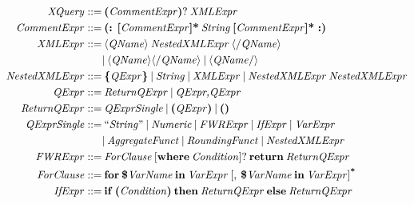 \begin{figure}[ht]
  \centering \fontsize{9}{12}\selectfont
  \begin{align*}
    \mtext{XQuery} ::= & \mspaceb \text{\textbf{(}\memph{CommentExpr}\textbf{)}}? \mspaceb \mtext{XMLExpr} \\
    \mtext{CommentExpr} ::= & \mspaceb \text{\textbf{(:} \textbf{[}\memph{CommentExpr}\textbf{]*}} \mspaceb \mtext{String} \mspaceb \text{\textbf{[}\memph{CommentExpr}\textbf{]*} \textbf{:)}} \\
    \mtext{XMLExpr} ::= & \mspaceb \mopentag{\mtext{QName}} \mspaceb \mtext{NestedXMLExpr} \mspaceb \mclosetag{\mtext{QName}} \\ \mspaceb & | \mspaceb \mopentag{\mtext{QName}} \mclosetag{\mtext{QName}} \mspaceb | \mspaceb \memptytag{\mtext{QName}} \\
    \mtext{NestedXMLExpr} ::= & \mspaceb \text{\textbf{\{}\memph{QExpr}\textbf{\}}} \mspaceb | \mspaceb \mtext{String} \mspaceb | \mspaceb \mtext{XMLExpr} \mspaceb | \mspaceb \mtext{NestedXMLExpr} \mspaceb \mtext{NestedXMLExpr} \\
    \mtext{QExpr} ::= & \mspaceb \mtext{ReturnQExpr} \mspaceb | \mspaceb \mtext{QExpr,}\mtext{QExpr} \\
    \mtext{ReturnQExpr} ::= & \mspaceb \mtext{QExprSingle} \mspaceb | \mspaceb \text{\textbf{(}\memph{QExpr}\textbf{)}} \mspaceb | \mspaceb \text{\textbf{()}} \\
    \mtext{QExprSingle} ::= & \mspaceb \text{``\memph{String}''} \mspaceb | \mspaceb \mtext{Numeric} \mspaceb | \mspaceb \mtext{FWRExpr} \mspaceb | \mspaceb \mtext{IfExpr} \mspaceb | \mspaceb \mtext{VarExpr} \\
    \mspaceb & | \mspaceb \mtext{AggregateFunct} \mspaceb | \mspaceb \mtext{RoundingFunct} \mspaceb | \mspaceb \mtext{NestedXMLExpr} \\
    \mtext{FWRExpr} ::= & \mspaceb \mtext{ForClause} \mspaceb [\text{\textbf{where}} \mspaceb \mtext{Condition}]? \mspaceb \text{\textbf{return}} \mspaceb \mtext{ReturnQExpr} \\
    \mtext{ForClause} ::= & \mspaceb \text{\textbf{for}} \mspaceb \text{\textbf{\$}\memph{VarName}} \mspaceb \text{\textbf{in}} \mspaceb \mtext{VarExpr} \mspaceb [, \mspaceb \text{\textbf{\$}\memph{VarName}} \mspaceb \text{\textbf{in}} \mspaceb \mtext{VarExpr}]^\text{\textbf{*}} \\
    \mtext{IfExpr} ::= & \mspaceb \text{\textbf{if}} \mspaceb \text{\textbf{(}\memph{Condition}\textbf{)}} \mspaceb \text{\textbf{then}} \mspaceb \mtext{ReturnQExpr} \mspaceb \text{\textbf{else}} \mspaceb \mtext{ReturnQExpr} \\

\end{align*}
\end{figure}
